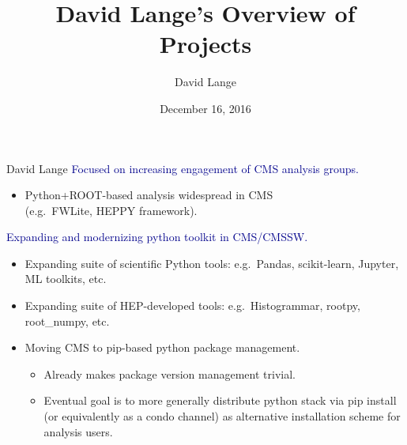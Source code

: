 \documentclass{beamer}
\title[2016-12-16-overview-of-projects]{David Lange's Overview of Projects}
\author{David Lange}
\institute{Princeton -- DIANA}
\date{December 16, 2016}
\begin{document}

\begin{frame}
  \titlepage
\end{frame}


\begin{frame}{David Lange}
\vspace{0.25 cm}
\textcolor{darkblue}{Focused on increasing engagement of CMS analysis groups.}
\begin{itemize}
\item Python+ROOT-based analysis widespread in CMS \\ (e.g.\ FWLite, HEPPY framework).
\end{itemize}

\textcolor{darkblue}{Expanding and modernizing python toolkit in CMS/CMSSW.}
\begin{itemize}
\item Expanding suite of scientific Python tools: e.g.\ Pandas, scikit-learn, Jupyter, ML toolkits, etc.
\item Expanding suite of HEP-developed tools: e.g.\ Histogrammar, rootpy, root\_numpy, etc.
\item Moving CMS to pip-based python package management.
\begin{itemize}
\item Already makes package version management trivial.
\item Eventual goal is to more generally distribute python stack via pip install (or equivalently as a condo channel) as alternative installation scheme for analysis users.
\end{itemize}
\end{itemize}
\end{frame}
\end{document}
